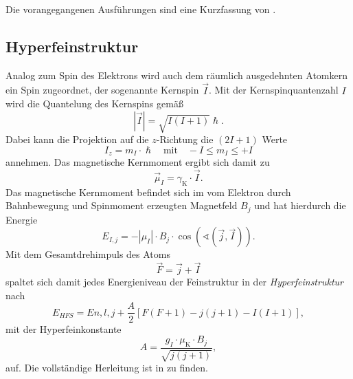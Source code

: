 \documentclass[../bericht.tex]{subfiles}
\begin{document}
        Die vorangegangenen Ausführungen sind eine Kurzfassung von \cite{dem:exp3-feinstruktur}.


      \subsection{Hyperfeinstruktur}
      \label{subsec:hyperfeinstruktur}

        Analog zum Spin des Elektrons wird auch dem räumlich ausgedehnten Atomkern ein Spin zugeordnet, der sogenannte Kernspin $\vec{I}$. Mit der Kernspinquantenzahl $I$ wird die Quantelung des Kernspins gemä\ss
        \begin{equation*}
          |\vec{I}|=\sqrt{I(I+1)}\hslash.
        \end{equation*}
        Dabei kann die Projektion auf die $z$-Richtung die $(2I+1)$ Werte
        \begin{equation*}
          I_z=m_I\cdot \hslash \quad \text{mit}\quad -I\le m_I \le +I
        \end{equation*}
        annehmen. Das magnetische Kernmoment ergibt sich damit zu
        \begin{equation*}
          \vec{\mu}_I=\gamma_\mathrm{K}\cdot \vec{I}.
        \end{equation*}
        Das magnetische Kernmoment befindet sich im vom Elektron durch Bahnbewegung und Spinmoment erzeugten Magnetfeld $B_j$ und hat hierdurch die Energie
        \begin{equation*}
          E_{I,j}=-|\mu_I|\cdot B_j \cdot \cos \left( \sphericalangle \left( \vec{j}, \vec{I}\right) \right).
        \end{equation*}
        Mit dem Gesamtdrehimpuls des Atoms
        \begin{equation*}
          \vec{F} = \vec{j}+\vec{I}
        \end{equation*}
        spaltet sich damit jedes Energieniveau der Feinstruktur in der \textit{Hyperfeinstruktur} nach
        \begin{equation}
          E_{HFS}=E{n,l,j} + \frac{A}{2}\left[ F(F+1) - j(j+1) - I(I+1) \right],
        \end{equation}
        mit der Hyperfeinkonstante
        \begin{equation*}
          A=\frac{g_I \cdot \mu_\mathrm{K}\cdot B_j}{\sqrt{j(j+1)}},
        \end{equation*}
        auf. Die vollständige Herleitung ist in \cite{dem:exp3-hyperfeinstruktur} zu finden.
\end{document}
